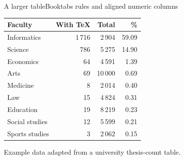 \documentclass[aspectratio=169]{beamer}
\begin{document}
\begin{frame}{A larger table}{Booktabs rules and aligned numeric columns}
  \centering
  \small
  \begin{tabularx}{\textwidth}{@{}Xrrr@{}}
    \toprule
    Faculty & With \TeX & Total & \% \\
    \midrule
    Informatics       & 1\,716 & 2\,904  & 59.09 \\
    Science           & 786    & 5\,275  & 14.90 \\
    Economics         & 64     & 4\,591  & 1.39  \\
    Arts              & 69     & 10\,000 & 0.69  \\
    Medicine          & 8      & 2\,014  & 0.40  \\
    Law               & 15     & 4\,824  & 0.31  \\
    Education         & 19     & 8\,219  & 0.23  \\
    Social studies    & 12     & 5\,599  & 0.21  \\
    Sports studies    & 3      & 2\,062  & 0.15  \\
    \bottomrule
  \end{tabularx}

  \vspace{.65em}
  \footnotesize Example data adapted from a university thesis-count table.
\end{frame}
\end{document}
